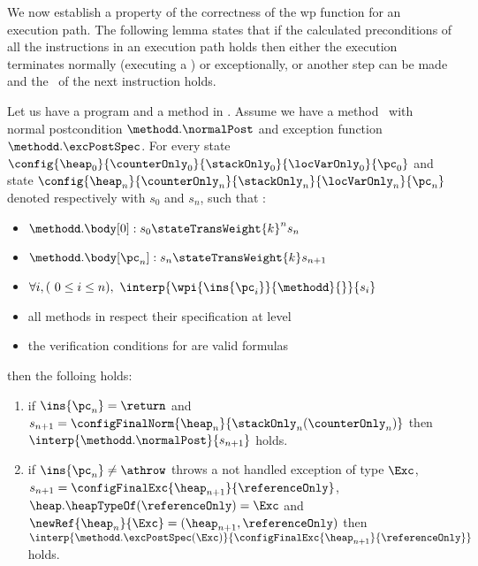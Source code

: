 We now establish a property of the correctness of the wp function  for an execution path. The following lemma states that if the calculated preconditions
of all the instructions in an execution path holds then either the execution terminates normally (executing a \return) or exceptionally, or 
another step can be made and the \fwpi \ of the next instruction holds.



\begin{lemma} \label{lemma1}
Let us have a program \Program{} and a method \methodd{} in \Program.
Assume we have a method \methodd \ with normal postcondition  $\methodd.\normalPost$ and exception function $\methodd.\excPostSpec$. 
For every state  
 $ \config{\heap_{0}}{\counterOnly_{0}}{\stackOnly_{0}}{\locVarOnly_{0}}{\pc_{0}}$ 
and state $\config{\heap_n}{\counterOnly_n}{\stackOnly_n}{\locVarOnly_n}{\pc_n} $ denoted respectively with $s_0$ and  $s_n$,
such that :
 \begin{itemize}
         \item $ \methodd.\body[0] : s_{0} \stateTransWeight{k}^{n} s_n$
         \item $ \methodd.\body[\pc_n] : s_n \stateTransWeight{k} s_{n+1}$
         \item $ \forall i, (\ 0 \leq i \leq n ) , \ \interp{\wpi{\ins{\pc_{i}} }{ \methodd } {  }}{ s_i } $  
	 \item all methods in \Program{} respect their specification at level   
	 \item the verification conditions for \Program{} are valid formulas
 \end{itemize}

then the folloing holds:
\begin{enumerate}
	\item if $\ins{\pc_n} = \return$ and $s_{n+1} =\configFinalNorm{\heap_n}{\stackOnly_n( \counterOnly_n )} $ then $\interp{\methodd.\normalPost} {s_{n+1} } $ holds.  
	
        	\item if $\ins{\pc_n}\neq \athrow  $ throws a not handled exception of type $\Exc$,
	 $ s_{n+1} = \configFinalExc{ \heap_{n+1}}{  \referenceOnly   }$, $\heap.\heapTypeOf(\referenceOnly) = \Exc  $ and  $\newRef{\heap_n}{\Exc} = (\heap_{n+1}, \referenceOnly )$
	 then  $\interp{\methodd.\excPostSpec( \Exc)}{\configFinalExc{ \heap_{n+1}}{  \referenceOnly   } } $ holds.
	

\end{enumerate}
\end{lemma}
